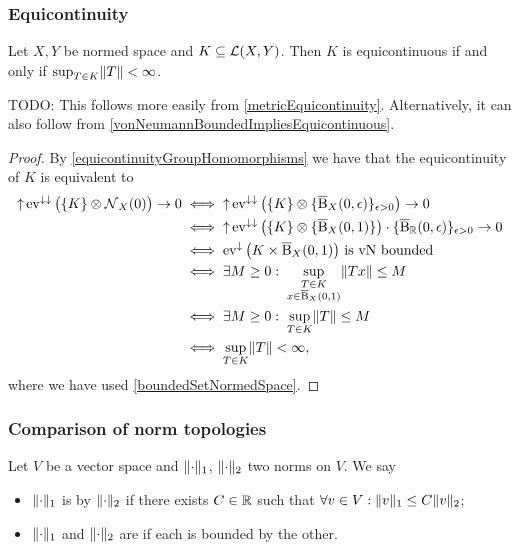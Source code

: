 \subsubsection{Equicontinuity}
\begin{proposition} \label{equicontinuityBoundedOperators}
Let $X,Y$ be normed space and $K\subseteq \operatorname{\mathcal{L}}(X,Y)$. Then $K$ is equicontinuous \textup{if and only if} $\sup_{T\in K}\lVert T\rVert < \infty$.
\end{proposition}
TODO: This follows more easily from \ref{metricEquicontinuity}. Alternatively, it can also follow from \ref{vonNeumannBoundedImpliesEquicontinuous}.
\begin{proof}
By \ref{equicontinuityGroupHomomorphisms} we have that the equicontinuity of $K$ is equivalent to
\begin{align*}
\operatorname{\uparrow} \operatorname{ev}^{\downarrow\downarrow}\big(\{K\}\otimes \operatorname{\mathcal{N}}_{X}(0)\big) \to 0 &\iff \operatorname{\uparrow} \operatorname{ev}^{\downarrow\downarrow}\big(\{K\}\otimes \{\operatorname{\overline{B}}_X(0,\epsilon)\}_{\epsilon > 0}\big) \to 0 \\
&\iff \operatorname{\uparrow} \operatorname{ev}^{\downarrow\downarrow}\big(\{K\}\otimes \{\operatorname{\overline{B}}_X(0,1)\}\big)\cdot \{\operatorname{\overline{B}}_{\mathbb{R}}(0,\epsilon)\}_{\epsilon > 0} \to 0 \\
&\iff \text{$\operatorname{ev}^{\downarrow}\big(K\times \operatorname{\overline{B}}_X(0,1)\big)$ is vN bounded} \\
&\iff \exists M\geq 0: \; \sup_{\substack{T\in K \\ x\in \operatorname{\overline{B}}_X(0,1)}} \lVert Tx\rVert \leq M \\
&\iff \exists M\geq 0: \; \sup_{T\in K} \lVert T\rVert \leq M \\
&\iff \sup_{T\in K} \lVert T\rVert < \infty,
\end{align*}
where we have used \ref{boundedSetNormedSpace}.
\end{proof}


\subsubsection{Comparison of norm topologies}
\begin{definition}
Let $V$ be a vector space and $\lVert\cdot\rVert_1$, $\lVert\cdot\rVert_2$ two norms on $V$. We say
\begin{itemize}
\item $\lVert\cdot\rVert_1$ is  by $\lVert\cdot\rVert_2$ if there exists $C\in \mathbb{R}$ such that $\forall v\in V: \lVert v\rVert_1 \leq C\lVert v\rVert_2$;
\item $\lVert\cdot\rVert_1$ and $\lVert\cdot\rVert_2$ are  if each is bounded by the other.
\end{itemize}
\end{definition}

